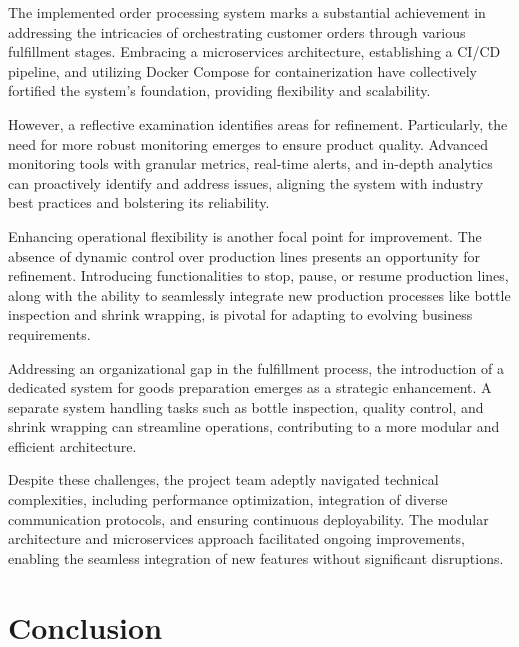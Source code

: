 \documentclass[conference, onecolumn]{IEEEtran}
\begin{document}

The implemented order processing system marks a substantial achievement in addressing the intricacies of orchestrating customer orders through various fulfillment stages. Embracing a microservices architecture, establishing a CI/CD pipeline, and utilizing Docker Compose for containerization have collectively fortified the system's foundation, providing flexibility and scalability.

However, a reflective examination identifies areas for refinement. Particularly, the need for more robust monitoring emerges to ensure product quality. Advanced monitoring tools with granular metrics, real-time alerts, and in-depth analytics can proactively identify and address issues, aligning the system with industry best practices and bolstering its reliability.

Enhancing operational flexibility is another focal point for improvement. The absence of dynamic control over production lines presents an opportunity for refinement. Introducing functionalities to stop, pause, or resume production lines, along with the ability to seamlessly integrate new production processes like bottle inspection and shrink wrapping, is pivotal for adapting to evolving business requirements.

Addressing an organizational gap in the fulfillment process, the introduction of a dedicated system for goods preparation emerges as a strategic enhancement. A separate system handling tasks such as bottle inspection, quality control, and shrink wrapping can streamline operations, contributing to a more modular and efficient architecture.

Despite these challenges, the project team adeptly navigated technical complexities, including performance optimization, integration of diverse communication protocols, and ensuring continuous deployability. The modular architecture and microservices approach facilitated ongoing improvements, enabling the seamless integration of new features without significant disruptions.

\section{Conclusion}

\end{document}
